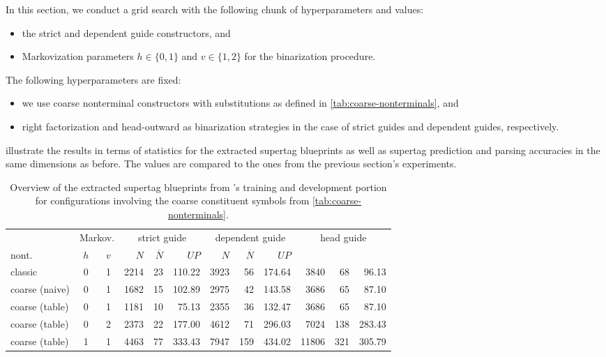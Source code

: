 \documentclass[../../document.tex]{subfiles}
\begin{document}
    In this section, we conduct a grid search with the following chunk of hyperparameters and values:
    \begin{itemize}
        \item the strict and dependent guide constructors, and
        \item Markovization parameters \(h \in \{0,1\}\) and \(v \in \{1,2\}\) for the binarization procedure.
    \end{itemize}
    The following hyperparameters are fixed:
    \begin{itemize}
        \item we use coarse nonterminal constructors with substitutions as defined in \cref{tab:coarse-nonterminals}, and
        \item right factorization and head-outward as binarization strategies in the case of strict guides and dependent guides, respectively.
    \end{itemize}
     illustrate the results in terms of statistics for the extracted supertag blueprints as well as supertag prediction and parsing accuracies in the same dimensions as before.
    The values are compared to the ones from the previous section's experiments.

    \begin{table}
        \caption{\label{tbl:gridsearch:coarse:1}
        Overview of the extracted supertag blueprints from \negra{}'s training and development portion for configurations involving the coarse constituent symbols from \cref{tab:coarse-nonterminals}.
        }
        \centering
        \vspace{.2cm}
        \begin{tabular}{lcc|rrr|rrr|rrr}
            \toprule
& \multicolumn{2}{c|}{Markov.}         & \multicolumn{3}{c|}{strict guide} &  \multicolumn{3}{c|}{dependent guide} &  \multicolumn{3}{c|}{head guide} \\
nont.           & \(h\) & \(v\) & $N$ & $\overline{N}$ & $\mathit{UP}$ & $N$ & $\overline{N}$ & $\mathit{UP}$  \\ \hline \rowcolor{black!10}
classic        & 0 & 1 & 2214 & 23 & 110.22 & 3923 & 56 & 174.64 & 3840 & 68 & 96.13 \\\rowcolor{black!10}
coarse (naive) & 0 & 1 & 1682 & 15 & 102.89 & 2975 & 42 & 143.58 & 3686 & 65 & 87.10 \\\hline
coarse (table) & 0 & 1 & 1181 & 10 & 75.13 & 2355 & 36 & 132.47 & 3686 & 65 & 87.10 \\
coarse (table) & 0 & 2 & 2373 & 22 & 177.00 & 4612 & 71 & 296.03 & 7024 & 138 & 283.43 \\
coarse (table) & 1 & 1 & 4463 & 77 & 333.43 & 7947 & 159 & 434.02 & 11806 & 321 & 305.79 \\
\bottomrule
        \end{tabular}
    \end{table}
\end{document}
